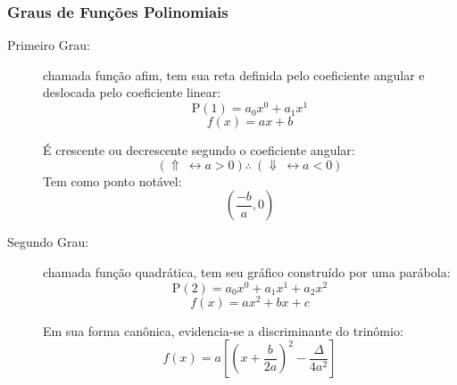     \subsubsection{Graus de Funções Polinomiais}
        \begin{description}
            \item[Primeiro Grau:] chamada função afim, tem sua reta definida pelo coeficiente angular e deslocada pelo coeficiente linear:
                \[ \mathrm{P}(1) = a_{0}x^{0} + a_{1}x^{1} \]
                \[ f(x) = ax + b \]
                \begin{center}
                \end{center}
                É crescente ou decrescente segundo o coeficiente angular:
                \[ (\Uparrow \ \leftrightarrow a > 0) \therefore \ (\Downarrow \ \leftrightarrow a < 0) \]
                Tem como ponto notável:
                \[ \left(\frac{-b}{a}, 0\right) \]
            \item[Segundo Grau:] chamada função quadrática, tem seu gráfico construído por uma parábola:
                \[ \mathrm{P}(2) = a_{0}x^{0} + a_{1}x^{1} + a_{2}x^{2} \]
                \[ f(x) = ax^2 + bx + c \]
                \begin{center}
                \end{center}
                Em sua forma canônica, evidencia-se a discriminante do trinômio:
                \[ f(x) = a \left[ \left( x + \frac{b}{2a} \right)^2 - \frac{\Delta}{4a^2} \right] \]

\end{description}
